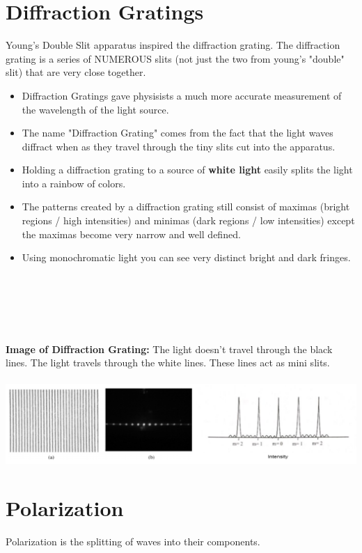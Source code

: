 \documentclass{article}
\begin{document}
\section{Diffraction Gratings}
Young's Double Slit apparatus inspired the diffraction grating. The diffraction grating is a series of NUMEROUS slits (not just the two from young's "double" slit) that are very close together.\\
\begin{itemize}
    \item Diffraction Gratings gave physisists a much more accurate measurement of the wavelength of the light source.
    \item The name "Diffraction Grating" comes from the fact that the light waves diffract when as they travel through the tiny slits cut into the apparatus.
    \item Holding a diffraction grating to a source of \textbf{white light} easily splits the light into a rainbow of colors.
    \item The patterns created by a diffraction grating still consist of maximas (bright regions / high intensities) and minimas (dark regions / low intensities) except the maximas become very narrow and well defined.
    \item Using monochromatic light you can see very distinct bright and dark fringes.
\end{itemize}\leavevmode\\\\\\\\\\
\noindent\textbf{Image of Diffraction Grating:}
The light doesn't travel through the black lines. The light travels through the white lines. These lines act as mini slits.\\\\
\includegraphics[scale=0.4]{images/diffraction_grating} \\

\section{Polarization}
Polarization is the splitting of waves into their components.
\end{document}
